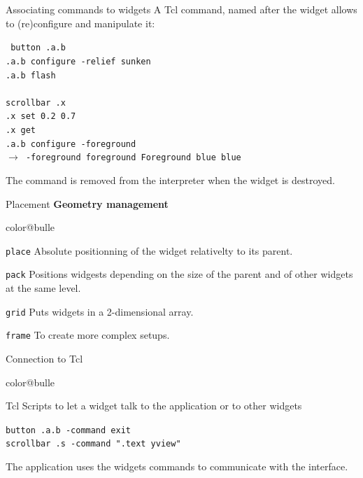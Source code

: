 \documentclass[a4paper,landscape,smooth]{show}
\begin{document}
\begin{tslide}{Associating commands to widgets}
   \vfill
   A Tcl command, named after the widget allows to (re)configure 
   and manipulate it:

   {\tt
      button .a.b\\
      .a.b configure -relief sunken\\
      .a.b flash\\
\\
      scrollbar .x\\
      .x set 0.2 0.7\\
      .x get\\

      .a.b configure -foreground\\
      $\rightarrow$ -foreground foreground Foreground blue blue}

    The command is removed from the interpreter when the widget is destroyed.
   \vfill
\end{tslide}


\begin{tslide}{Placement}
   \vfill
   {\bf Geometry management}
   \begin{bitemize}{color@bulle}
      \item {\tt place}
        Absolute positionning of the widget relativelty to its parent.

      \item {\tt pack}
        Positions widgests depending on the size of the parent and of 
        other widgets at the same level.

      \item {\tt grid}
        Puts widgets in a 2-dimensional array.
      \item {\tt frame}
        To create more complex setups.
   \end{bitemize}
   \vfill
\end{tslide}


\begin{tslide}{Connection to Tcl}
   \vfill
   \begin{bitemize}{color@bulle}
      \item Tcl Scripts to let a widget talk to the application 
        or to other widgets 

	    {\tt button .a.b -command exit}\\
	    {\tt scrollbar .s -command ".text yview"}

      \item The application uses the widgets commands to communicate
        with the interface.
   \end{bitemize}
   \vfill
\end{tslide}
\end{document}
